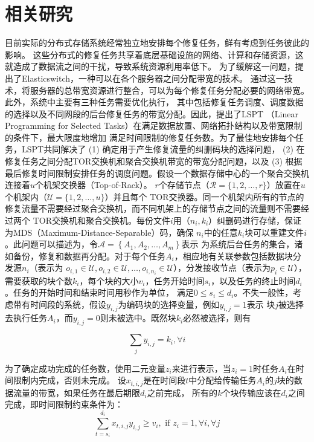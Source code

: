 \chapter{相关研究}

目前实际的分布式存储系统经常独立地安排每个修复任务，鲜有考虑到任务彼此的影响。
这些分布式的修复任务共享着底层基础设施的网络、计算和存储资源，这就造成了数据流之间的干扰，导致系统资源利用率低下。
为了缓解这一问题，\citet{popa2013elasticswitch}提出了Elasticswitch，一种可以在各个服务器之间分配带宽的技术。
通过这一技术，将服务器的总带宽资源进行整合，可以为每个修复任务分配必要的网络带宽。此外，系统中主要有三种任务需要优化执行，
其中包括修复任务调度、调度数据的选择以及不同网段的后台修复任务的带宽分配。因此，\citet{li2018joint}提出了LSPT
（Linear Programming for Selected Tasks）在满足数据放置、网络拓扑结构以及带宽限制的条件下，最大限度地增加
满足时间限制的修复任务数。为了最佳地安排每个任务，LSPT共同解决了
(1) 确定用于产生修复流量的纠删码块的选择问题，
(2) 在修复任务之间分配TOR交换机和聚合交换机带宽的带宽分配问题，以及
(3) 根据最后修复时间限制安排任务的调度问题。假设一个数据存储中心的一个聚合交换机连接着$u$个机架交换器（Top-of-Rack）。
$r$个存储节点（$\mathcal{R}=\{1,2, \ldots, r\}$）放置在$u$个机架内（$\mathcal{U}=\{1,2, \ldots, u\}$）并且每个
TOR交换器。同一个机架内所有的节点的修复流量不需要经过聚合交换机，而不同机架上的存储节点之间的流量则不需要经过两个
TOR交换机和聚合交换机。每份文件$i$用（$n_i, k_i$）纠删码进行存储，保证为MDS（Maximum-Distance-Separable）码，确保
$n_i$中的任意$k_i$块可以重建文件$i$。此问题可以描述为，令$\mathcal{A}=\left\{A_{1}, A_{2}, \ldots, A_{m}\right\}$表示
为系统后台任务的集合，诸如备份，修复和数据再分配。对于每个任务$A_i$，相应地有关联参数包括数据块分发源$n_i$（表示为
$o_{i, 1} \in \mathcal{U}, o_{i, 2} \in \mathcal{U}, \ldots, o_{i, n_{i}} \in \mathcal{U}$），分发接收节点（表示为$p_{i} \in \mathcal{U}$），
需要获取的块个数$k_i$，每个块的大小$v_i$，任务开始时间$s_i$，以及任务的终止时间$d_i$。任务的开始时间和结束时间用秒作为单位，
满足$0 \leq s_{i} \leq d_{i}$。不失一般性，考虑带有时间段的系统，假设$y_{i, j}$为编码块的选择变量，例如$y_{i, j}=1$表示
块$j$被选择去执行任务$A_i$，而$y_{i, j}=0$则未被选中。既然块$k_i$必然被选择，则有

\begin{equation}
	\label{eq:2-1}
	\sum_{j} y_{i, j}=k_{i}, \forall i
\end{equation}

为了确定成功完成的任务数，使用二元变量$z_i$来进行表示，当$z_i=1$时任务$A_i$在时间限制内完成，否则未完成。
设$x_{t, i, j}$是在时间段$t$中分配给传输任务$A_i$的$j$块的数据流量的带宽，如果任务在最后期限$d_i$之前完成，
所有的$k$个块传输应该在$d_i$之间完成，即时间限制约束条件为：
\begin{equation}
	\label{eq:2-2}
    \sum_{t=s_{i}}^{d_{i}} x_{t, i, j} y_{i, j} \geq v_{i}, \text { if } z_{i}=1, \forall i, \forall j
\end{equation}


